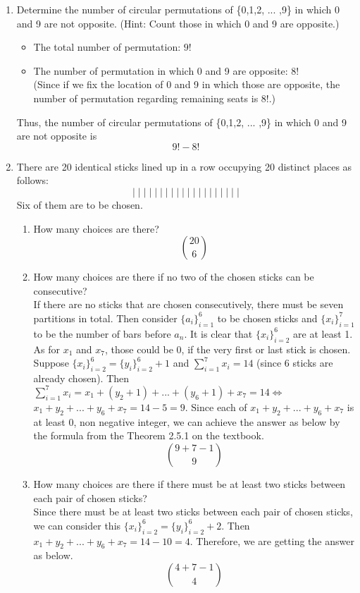 \documentclass[12pt]{article}
\begin{document}
\begin{enumerate}
    \item Determine the number of circular permutations of \{0,1,2, ... ,9\} in which 0 and 9 are not opposite. (Hint: Count those in which 0 and 9 are opposite.)
    \begin{itemize}
        \item The total number of permutation: \boldmath$9!$
        \item The number of permutation in which 0 and 9 are opposite: \boldmath$8!$\\
        (Since if we fix the location of 0 and 9 in which those are opposite, the number of permutation regarding remaining seats is 8!.)
    \end{itemize}
    Thus, the number of circular permutations of \{0,1,2, ... ,9\} in which 0 and 9 are not opposite is 
    $$9!-8!$$
    \item There are 20 identical sticks lined up in a row occupying 20 distinct places as follows:
    $$|\;|\;|\;|\;|\;|\;|\;|\;|\;|\;|\;|\;|\;|\;|\;|\;|\;|\;|\;|$$
    Six of them are to be chosen.
    \begin{enumerate}[label=(\alph*)]
        \item How many choices are there?
        $$\binom{20}{6}$$
        \item How many choices are there if no two of the chosen sticks can be consecutive?\\
        
        If there are no sticks that are chosen consecutively, there must be seven partitions in total. Then consider $\{a_i\}_{i=1}^6$ to be chosen sticks and $\{x_i\}_{i=1}^7$ to be the number of bars before $a_n$. It is clear that $\{x_i\}_{i=2}^6$ are at least 1. As for $x_1$ and $x_7$, those could be 0, if the very first or last stick is chosen.\\
        
        Suppose $\{x_i\}_{i=2}^6 = \{y_i\}_{i=2}^6+1$ and $\sum_{i=1}^7 x_i = 14$ (since 6 sticks are already chosen). Then $\sum_{i=1}^7 x_i = x_1 + (y_2+1) + ... + (y_6 +1) + x_7 = 14 \Leftrightarrow$\\
        $x_1+y_2+...+y_6+x_7 = 14-5 = 9$. Since each of $x_1+y_2+...+y_6+x_7$ is at least 0, non negative integer, we can achieve the answer as below by the formula from the Theorem 2.5.1 on the textbook.
        $$\binom{9+7-1}{9}$$
        
        \item How many choices are there if there must be at least two sticks between each pair of chosen sticks?\\
        
        Since there must be at least two sticks between each pair of chosen sticks, we can consider this $\{x_i\}_{i=2}^6 = \{y_i\}_{i=2}^6+2$. Then $x_1+y_2+...+y_6+x_7 = 14-10 = 4$. Therefore, we are getting the answer as below.
        $$\binom{4+7-1}{4}$$
    \end{enumerate}
\end{enumerate}
\end{document}
